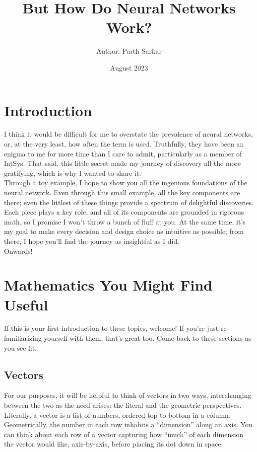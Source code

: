 \documentclass{article}
\title{But How Do Neural Networks Work?}
\author{Author: Parth Sarkar}
\date{August 2023}
\begin{document}
\maketitle

\section{Introduction}
I think it would be difficult for me to overstate the prevalence of neural networks, or, at the very least, how often the term is used. Truthfully, they have been an enigma to me for more time than I care to admit, particularly as a member of IntSys. That said, this little secret made my journey of discovery all the more gratifying, which is why I wanted to share it. \\ 

Through a toy example, I hope to show you all the ingenious foundations of the neural network. Even through this small example, all the key components are there; even the littlest of these things provide a spectrum of delightful discoveries. Each piece plays a key role, and all of its components are grounded in rigorous math, so I promise I won't throw a bunch of fluff at you. At the same time, it's my goal to make every decision and design choice as intuitive as possible; from there, I hope you'll find the journey as insightful as I did. \\

Onwards!

\section{Mathematics You Might Find Useful}
If this is your first introduction to these topics, welcome! If you're just re-familiarizing yourself with them, that's great too. Come back to these sections as you see fit.

\subsection{Vectors}

For our purposes, it will be helpful to think of vectors in two ways, interchanging between the two as the need arises: the literal and the geometric perspectives. \\

Literally, a vector is a list of numbers, ordered top-to-bottom in a column. Geometrically, the number in each row inhabits a ``dimension'' along an axis. You can think about each row of a vector capturing how ``much'' of each dimension the vector would like, axis-by-axis, before placing its dot down in space. \\
\end{document}
